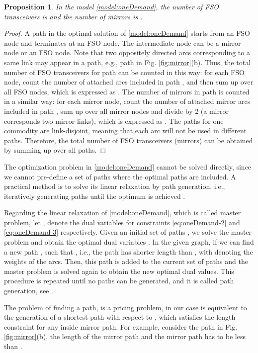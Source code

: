 \documentclass[onecolumn,11pt,draftclsnofoot]{IEEEtran}
\newtheorem{proposition}{Proposition}
\begin{document}
\begin{proposition}\label{pp:oneDemand}
In the model \eqref{model:oneDemand}, the number of FSO transceivers is  and the number of mirrors is . 
\end{proposition}
\begin{proof}
A path in the optimal solution of \eqref{model:oneDemand} starts from an FSO node and terminates at an FSO node. The intermediate node can be a mirror node or an FSO node. Note that two oppositely directed arcs corresponding to a same link may appear in a path, e.g., path  in Fig. \ref{fig:mirror}(b). Thus, the total number of FSO transceivers for path  can be counted in this way: for each FSO node, count the number of attached arcs included in path , and then sum up over all FSO nodes, which is expressed  as . The number of mirrors in path  is counted in a similar way: for each mirror node, count the number of attached mirror arcs included in path , sum up over all mirror nodes and divide by 2 (a mirror corresponds two mirror links), which is expressed as . The paths for one commodity are link-disjoint, meaning that each arc  will not be used in different paths. Therefore, the total number of FSO transceivers (mirrors) can be obtained by summing up over all paths.
\end{proof}

The optimization problem in \eqref{model:oneDemand} cannot be solved directly, since we cannot pre-define a set of paths where the optimal paths are included. A practical method is to solve its linear relaxation by path generation, i.e., iteratively generating paths until the optimum is achieved \cite{pioro2004}.

Regarding the linear relaxation of \eqref{model:oneDemand}, which is called master problem, let ,  denote the dual variables for constraints \eqref{eq:oneDemand-2} and \eqref{eq:oneDemand-3} respectively. Given an initial set of paths , we solve the master problem and obtain the optimal dual variables .
In the given graph, if we can find a new path , such that , i.e., the path has shorter length than , with  denoting the weights of the arcs. Then, this path is added to the current set of paths and the master problem is solved again to obtain the new optimal dual values. This procedure is repeated until no paths can be generated, and it is called path generation, see \cite{pioro2004}.

The problem of finding a path, is a pricing problem, in our case is equivalent to the generation of a shortest path with respect to , which satisfies the length constraint for any inside mirror path. For example, consider the path  in Fig. \ref{fig:mirror}(b), the length of the mirror path  and the mirror path  has to be less than .
\end{document}
